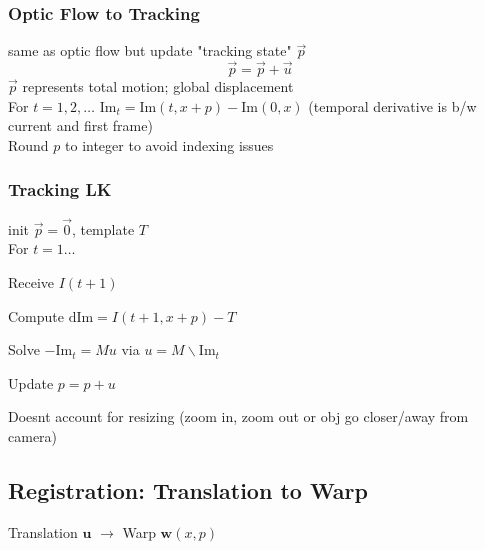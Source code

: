 \documentclass{article}
\begin{document}
\subsubsection{Optic Flow to Tracking}
same as optic flow but update "tracking state" $\vec p$ 
\[
    \vec p = \vec p+ \vec u
\]
$\vec p$ represents total motion; global displacement
\\
For $t=1,2,\ldots$ $\mathrm{Im}_t = \mathrm{Im}(t,x+p) - \mathrm{Im}(0,x)$ (temporal derivative is b/w current and first frame)
\\
Round $p$ to integer to avoid indexing issues

\subsubsection{Tracking LK}
init $\vec p=\vec 0$, template $T$\\
For $t=1\ldots$
\begin{list}{}{}
    \item Receive $I(t+1)$
    \item Compute $\mathrm{dIm} = I(t+1, x+p) - T$
    \item Solve $-\mathrm{Im}_t = Mu$ via $u = M \backslash \mathrm{Im}_t$
    \item Update $p=p+u$
\end{list}
\noindent
Doesnt account for resizing (zoom in, zoom out or obj go closer/away from camera)

\subsection{Registration: Translation to Warp}
Translation $\mathbf u $ $\to$ Warp $\mathbf w(x,p)$
\end{document}
